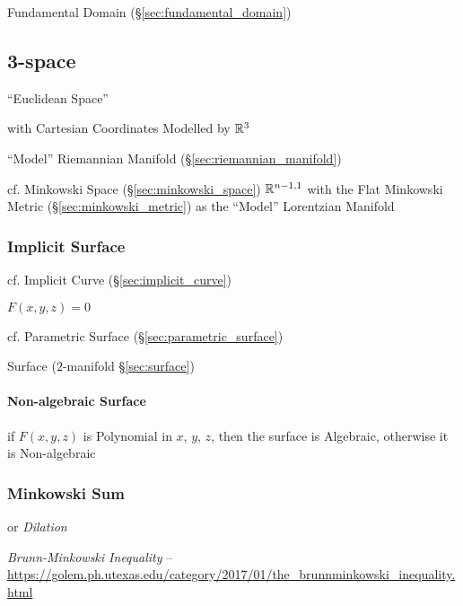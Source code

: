 Fundamental Domain (\S\ref{sec:fundamental_domain})



\subsection{3-space}\label{sec:3_space}

``Euclidean Space''

with Cartesian Coordinates Modelled by $\mathbb{R}^3$

``Model'' Riemannian Manifold (\S\ref{sec:riemannian_manifold})

cf. Minkowski Space (\S\ref{sec:minkowski_space}) $\mathbb{R}^{n-1,1}$
with the Flat Minkowski Metric (\S\ref{sec:minkowski_metric}) as the
``Model'' Lorentzian Manifold



\subsubsection{Implicit Surface}\label{sec:implicit_surface}

\fist cf. Implicit Curve (\S\ref{sec:implicit_curve})

$F(x,y,z) = 0$

\fist cf. Parametric Surface (\S\ref{sec:parametric_surface})

\fist Surface ($2$-manifold \S\ref{sec:surface})



\paragraph{Non-algebraic Surface}\label{sec:nonalgebraic_surface}\hfill

if $F(x,y,z)$ is Polynomial in $x$, $y$, $z$, then the surface is
Algebraic, otherwise it is Non-algebraic



\subsubsection{Minkowski Sum}\label{sec:minkowski_sum}

or \emph{Dilation}

\emph{Brunn-Minkowski Inequality} --
\url{https://golem.ph.utexas.edu/category/2017/01/the_brunnminkowski_inequality.html}



